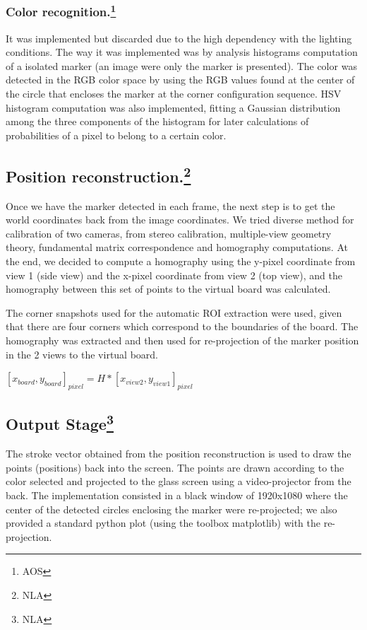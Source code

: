 \documentclass[a4paper,12pt]{article}
\begin{document}
\subsubsection[Color recognition]{Color recognition.\footnote{AOS}}
It was implemented but discarded due to the high dependency with the lighting conditions. The way it was implemented was by analysis histograms computation of a isolated marker (an image were only the marker is presented). The color was detected in the RGB color space by using the RGB values found at the center of the circle that encloses the marker at the corner configuration sequence. HSV histogram computation was also implemented, fitting a Gaussian distribution among the three components of the histogram for later calculations of probabilities of a pixel to belong to a certain color.

\subsection[Position reconstruction.]{Position reconstruction.\footnote{NLA}} 
Once we have the marker detected in each frame, the next step is to get the world coordinates back from the image coordinates. We tried diverse method for calibration of two cameras, from stereo calibration, multiple-view geometry theory, fundamental matrix correspondence and homography computations. At the end, we decided to compute a homography using the y-pixel coordinate from view 1 (side view) and the x-pixel coordinate from view 2 (top view), and the homography between this set of points to the virtual board was calculated. 

The corner snapshots used for the automatic ROI extraction were used, given that there are four corners which correspond to the boundaries of the board. The homography was extracted and then used for re-projection of the marker position in the 2 views to the virtual board.

\begin{center}
$ [x_{board}, y_{board}]_{pixel}= H*[x_{view2}, y_{view1}]_{pixel} $
\end{center}


\subsection[Output Stage]{Output Stage\footnote{NLA}} 
The stroke vector obtained from the position reconstruction is used to draw the points (positions) back into the screen. The points are drawn according to the color selected and projected to the glass screen using a video-projector from the back. The implementation consisted in a black window of 1920x1080 where the center of the detected circles enclosing the marker were re-projected; we also provided a standard python plot (using the toolbox matplotlib) with the re-projection.
\end{document}
